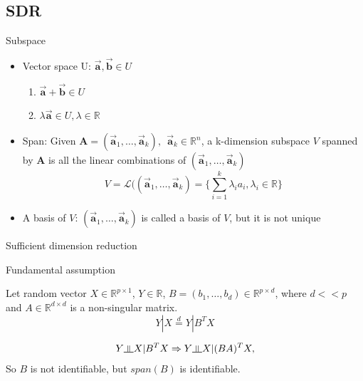 \documentclass[ignorenonframetext,]{beamer}
\providecommand{\tightlist}{%
  \setlength{\itemsep}{0pt}\setlength{\parskip}{0pt}}
\newcommand{\indep}{\rotatebox[origin=c]{90}{$\models$}}
\begin{document}
\subsection{SDR}\label{sdr}

\begin{frame}{Subspace}

\begin{itemize}
\item
  Vector space U: \(\vec{\mathbf{a}}, \vec{\mathbf{b}} \in U\)

  \begin{enumerate}
  \def\labelenumi{\arabic{enumi}.}
  \tightlist
  \item
    \(\vec{\mathbf{a}} + \vec{\mathbf{b}} \in U\)\\
  \item
    \(\lambda \vec{\mathbf{a}} \in U, \lambda \in \mathbb{R}\)
  \end{enumerate}
\item
  Span: Given
  \(\mathbf{A} = (\vec{\mathbf{a}}_1, \dots, \vec{\mathbf{a}}_k), ~~\vec{\mathbf{a}}_k \in \mathbb{R}^n\),
  a k-dimension subspace \(V\) spanned by \(\mathbf{A}\) is all the
  linear combinations of
  \((\vec{\mathbf{a}}_1, \dots, \vec{\mathbf{a}}_k)\) \[
  V = \mathcal{L}((\vec{\mathbf{a}}_1, \dots, \vec{\mathbf{a}}_k) = \{\sum_{i = 1}^k\lambda_ia_i, \lambda_i\in \mathbb{R}\}
  \]
\item
  A basis of \(V\): \((\vec{\mathbf{a}}_1, \dots, \vec{\mathbf{a}}_k)\)
  is called a basis of \(V\), but it is not unique
\end{itemize}

\end{frame}

\begin{frame}{Sufficient dimension reduction}

\begin{block}{Fundamental assumption}

Let random vector \(X \in \mathbb{R}^{p \times 1}\),
\(Y \in \mathbb{R}\),
\(B = (b_1, \dots,b_d) \in \mathbb{R}^{p\times d}\), where \(d << p\)
and \(A \in \mathbb{R}^{d\times d}\) is a non-singular matrix. \[
Y|X \stackrel{d}{=} Y|B^T X
\]

\[
  Y \indep X|B^TX \Rightarrow Y \indep X|(BA)^TX, 
\] So \(B\) is not identifiable, but \(span(B)\) is identifiable.

\end{block}

\end{frame}
\end{document}

